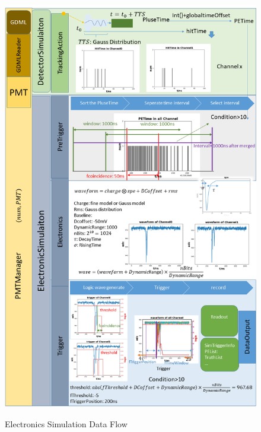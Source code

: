 \begin{figure}[htbp]
    \includegraphics[width=\textwidth]{data/SimModule/ElectronicsSimulation/dataflow.png}
    \label{ElecSimDataFlow}
    \caption{Electronics Simulation Data Flow}
\end{figure}
